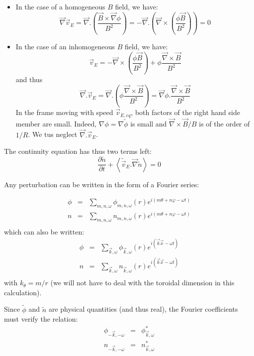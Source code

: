 \begin{itemize}
\item In the case of a homogeneous $B$ field, we have:
\[
		\vec{\nabla}\vec{v}_E = \vec{\nabla}. \left( \frac{\vec{B}\times\vec{\nabla}\phi}{B^2} \right) = - \vec{\nabla}. \left( \vec{\nabla} \times \left( \frac{\phi \vec{B}}{B^2} \right) \right) = 0
\]
\item In the case of an inhomogeneous $B$ field, we have:
\[
		\vec{v}_E = - \vec{\nabla} \times \left( \frac{\phi \vec{B}}{B^2} \right) + \phi \frac{\vec{\nabla}\times \vec{B}}{B^2}
\]
and thus
\[
		\vec{\nabla}. \vec{v}_E = \vec{\nabla}. \left( \phi \frac{\vec{\nabla} \times \vec{B}}{B^2} \right) = \vec{\nabla} \phi . \frac{\vec{\nabla} \times \vec{B}}{B^2}
\]
In the frame moving with speed $\vec{v}_{E,eq}$, both factors of the right hand side member are small. Indeed,  $\nabla \phi = \nabla \tilde{\phi}$ is small and $\vec{\nabla} \times \vec{B}/B$ is of the order of $1/R$. We tus neglect $\vec{\nabla}. \vec{v}_E$.
\end{itemize}
The continuity equation has thus two terms left:
\[
		\frac{\partial \tilde{n}}{\partial t} + \left< \tilde{\vec{v}}_E . \vec{\nabla}\tilde{n} \right> = 0
\]

Any perturbation can be written in the form of a Fourier series:

\begin{eqnarray*}
		\phi & = & \sum_{m,n,\omega} \phi_{m,n,\omega}(r) e^{i(m\theta + n\varphi-\omega t)}		\\
		n   & = & \sum_{m,n,\omega}    n_{m,n,\omega}(r) e^{i(m\theta + n\varphi-\omega t)}		\\
\end{eqnarray*}
which can also be written:
\begin{eqnarray*}
		\phi & = & \sum_{\vec{k},\omega} \phi_{\vec{k},\omega}(r) e^{i(\vec{k}\vec{x}-\omega t)}		\\
		n   & = & \sum_{\vec{k},\omega}    n_{\vec{k},\omega}(r) e^{i(\vec{k}\vec{x}-\omega t)}		\\
\end{eqnarray*}
with $k_\theta = m/r$ (we will not have to deal with the toroidal dimension in this calculation).

Since $\tilde{\phi}$ and $\tilde{n}$ are physical quantities (and thus real), the Fourier coefficients must verify the relation:
\begin{eqnarray*}
		\phi_{-\vec{k},-\omega} & = & \phi_{\vec{k},\omega}^*		\\
		n_{-\vec{k},-\omega} & = & n_{\vec{k},\omega}^*
\end{eqnarray*}

